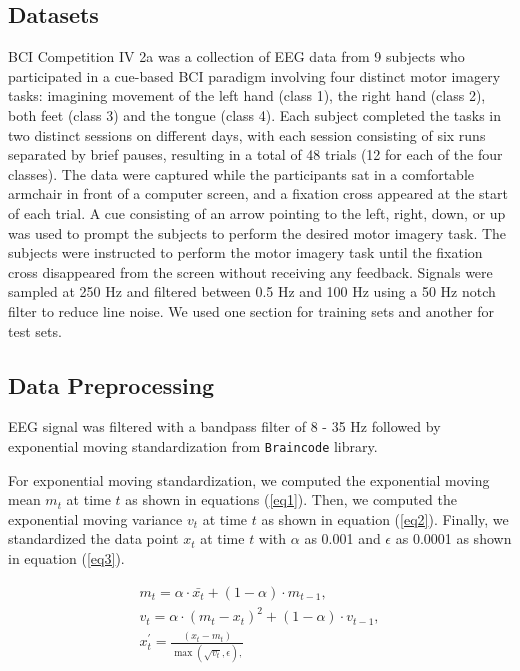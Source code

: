 \subsection{Datasets}
BCI Competition IV 2a \cite{brunner2008bci} was a collection of EEG data from 9 subjects who participated in a cue-based BCI paradigm involving four distinct motor imagery tasks: imagining movement of the left hand (class 1), the right hand (class 2), both feet (class 3) and the tongue (class 4).
Each subject completed the tasks in two distinct sessions on different days, with each session consisting of six runs separated by brief pauses, resulting in a total of 48 trials (12 for each of the four classes).
The data were captured while the participants sat in a comfortable armchair in front of a computer screen, and a fixation cross appeared at the start of each trial.
A cue consisting of an arrow pointing to the left, right, down, or up was used to prompt the subjects to perform the desired motor imagery task.
The subjects were instructed to perform the motor imagery task until the fixation cross disappeared from the screen without receiving any feedback.
Signals were sampled at 250 Hz and filtered between 0.5 Hz and 100 Hz using a 50 Hz notch filter to reduce line noise.
We used one section for training sets and another for test sets.

\subsection{Data Preprocessing}
EEG signal was filtered with a bandpass filter of 8 - 35 Hz followed by exponential moving standardization from \texttt{Braincode} library.

For exponential moving standardization, we computed the exponential moving mean $m_{t}$ at time $t$ as shown in equations (\ref{eq1}).
Then, we computed the exponential moving variance $v_{t}$ at time $t$ as shown in equation (\ref{eq2}).
Finally, we standardized the data point $x_{t}$ at time $t$ with $\alpha$ as 0.001 and $\epsilon$ as 0.0001 as shown in equation (\ref{eq3}).

\begin{eqnarray} 
m_{t} = \alpha \cdot \bar{x_{t}} + (1 - \alpha) \cdot m_{t-1}, \label{eq1}\\
v_{t} = \alpha\cdot (m_{t} - x_{t})^{2} + (1 - \alpha) \cdot v_{t-1} , \label{eq2} \\ 
x^{\prime}_{t} = \frac{(x_{t}-m_{t})}{\max(\sqrt{v_{t}},\epsilon), \label{eq3} }
\end{eqnarray}


